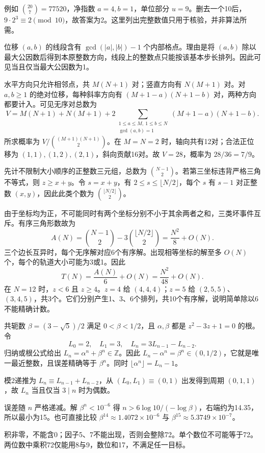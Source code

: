 例如 $\binom{20}{7}=77520$，净指数 $a=4,b=1$，单位部分 $u=9$。删去一个10后，$9\cdot2^3\equiv2\pmod{10}$，故答案为2。这里列出完整数值只用于核验，并非算法所需。

位移 $(a,b)$ 的线段含有 $\gcd(|a|,|b|)-1$ 个内部格点。理由是将 $(a,b)$ 除以最大公因数后得到本原整数方向，线段上的整数点只能按该基本步长排列。因此可见当且仅当最大公因数为1。

水平方向只允许相邻点，共 $M(N+1)$ 对；竖直方向有 $N(M+1)$ 对。对 $a,b\ge1$ 的绝对位移，每种斜率方向有 $(M+1-a)(N+1-b)$ 对，两种方向都要计入。可见无序对总数为
\[
V=M(N+1)+N(M+1)
+2\sum_{\substack{1\le a\le M,\ 1\le b\le N\\\gcd(a,b)=1}}
(M+1-a)(N+1-b).
\]
所求概率为 $V/\binom{(M+1)(N+1)}2$。在 $M=N=2$ 时，轴向共有12对；合法正位移为 $(1,1),(1,2),(2,1)$，斜向贡献16对。故 $V=28$，概率为 $28/36=7/9$。

先计不限制大小顺序的正整数三元组，总数为 $\binom{N-1}{2}$。若第三坐标违背严格三角不等式，则 $z\ge x+y$。令 $s=x+y$，有 $2\le s\le\lfloor N/2\rfloor$，每个 $s$ 有 $s-1$ 对正整数 $(x,y)$，因此此类个数为 $\binom{\lfloor N/2\rfloor}{2}$。

由于坐标均为正，不可能同时有两个坐标分别不小于其余两者之和，三类坏事件互斥。有序三角形数故为
\[
A(N)=\binom{N-1}{2}-3\binom{\lfloor N/2\rfloor}{2}
=\frac{N^2}{8}+O(N).
\]
三个边长互异时，每个无序解对应6个有序解。出现相等坐标的解至多 $O(N)$ 个，每个的轨道大小可能为3或1。因此
\[
T(N)=\frac{A(N)}6+O(N)=\frac{N^2}{48}+O(N).
\]
在 $N=12$ 时，$z<6$ 且 $z\ge4$。$z=4$ 给 $(4,4,4)$；$z=5$ 给 $(2,5,5)$、$(3,4,5)$，共3个。它们分别产生1、3、6个排列，共10个有序解，说明简单除以6不能精确计数。

共轭数 $\beta=(3-\sqrt5)/2$ 满足 $0<\beta<1/2$，且 $\alpha,\beta$ 都是 $z^2-3z+1=0$ 的根。令
\[
L_0=2,\quad L_1=3,\quad L_n=3L_{n-1}-L_{n-2}.
\]
归纳或根公式给出 $L_n=\alpha^n+\beta^n\in\mathbb Z$。因此 $L_n-\alpha^n=\beta^n\in(0,1/2)$，它就是唯一最近整数，且误差精确等于 $\beta^n$。同时 $\lfloor\alpha^n\rfloor=L_n-1$。

模2递推为 $L_n\equiv L_{n-1}+L_{n-2}$，从 $(L_0,L_1)\equiv(0,1)$ 出发得到周期 $(0,1,1)$，故 $L_n$ 当且仅当 $3\mid n$ 时为偶数。

误差随 $n$ 严格递减。解 $\beta^n<10^{-6}$ 得 $n>6\log 10/(-\log\beta)$，右端约为14.35，所以最小为15。也可直接比较 $\beta^{14}\approx1.4072\times10^{-6}$ 与 $\beta^{15}\approx5.3749\times10^{-7}$。

积非零，不能含0；因子5、7不能出现，否则会整除72。单个数位不可能等于72。两位数中乘积72仅能用8与9，数位和17，不满足任一目标。

